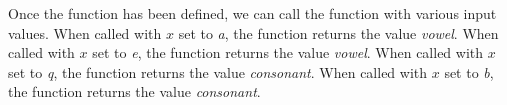 \begin{frame}[fragile]
{Once the function has been defined, we can call the function with various input values.
%
When called with $x$ set to \textit{a}, the function returns the value \textit{vowel}.
When called with $x$ set to \textit{e}, the function returns the value \textit{vowel}.
When called with $x$ set to \textit{q}, the function returns the value \textit{consonant}.
When called with $x$ set to \textit{b}, the function returns the value \textit{consonant}.

}

\end{frame}

